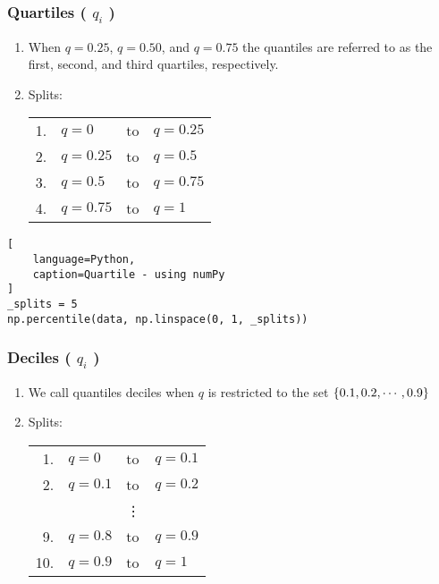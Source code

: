\subsubsection{Quartiles ( $q_i$ ) \cite{statistics/book/Statistics-for-Data-Scientists/Maurits-Kaptein}} \label{Data/Describing Data/Central Tendency/Quartiles}

\begin{enumerate}
    \item When $q = 0.25$, $q = 0.50$, and $q = 0.75$ the quantiles are referred to as the first, second, and third quartiles, respectively. \hfill \cite{statistics/book/Statistics-for-Data-Scientists/Maurits-Kaptein}
    \label{Data/Describing Data/Central Tendency/Quartiles/first quartile}
    \label{Data/Describing Data/Central Tendency/Quartiles/second quartile}
    \label{Data/Describing Data/Central Tendency/Quartiles/third quartile}

    \item Splits: \\
    \begin{tabular}{r l l l} %
        1. & $q = 0$ & to & $q = 0.25$ \\
        2. & $q = 0.25$ & to & $q = 0.5$ \\
        3. & $q = 0.5$ & to & $q = 0.75$ \\
        4. & $q = 0.75$ & to & $q = 1$ \\
    \end{tabular}
\end{enumerate}

\begin{lstlisting}[
    language=Python,
    caption=Quartile - using numPy
]
_splits = 5
np.percentile(data, np.linspace(0, 1, _splits))
\end{lstlisting}


\subsubsection{Deciles ( $q_i$ ) \cite{statistics/book/Statistics-for-Data-Scientists/Maurits-Kaptein}} \label{Data/Describing Data/Central Tendency/Deciles}

\begin{enumerate}
    \item We call quantiles deciles when $q$ is restricted to the set $\left\{0.1, 0.2,\cdots, 0.9\right\}$ \hfill \cite{statistics/book/Statistics-for-Data-Scientists/Maurits-Kaptein}

    \item Splits: \\
    \begin{tabular}{r l l l} %
        1. & $q = 0$ & to & $q = 0.1$ \\
        2. & $q = 0.1$ & to & $q = 0.2$ \\
        && \vdots & \\
        9. & $q = 0.8$ & to & $q = 0.9$ \\
        10. & $q = 0.9$ & to & $q = 1$ \\
    \end{tabular}
\end{enumerate}



